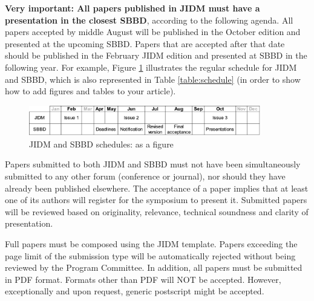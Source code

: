 \documentclass[jidm,a4paper]{jidm} %
\begin{document}
\textbf{Very important: All papers published in JIDM must have a presentation in the closest SBBD}, according to the following agenda. All papers accepted by middle August will be published in the October edition and presented at the upcoming SBBD. Papers that are accepted after that date should be published in the February JIDM edition and presented at SBBD in the following year. For example, Figure \ref{fig:schedule} illustrates the regular schedule for JIDM and SBBD, which is also represented in Table \ref{table:schedule} (in order to show how to add figures and tables to your article).


\begin{figure}[t] %
\begin{center}	%
		\includegraphics[width=0.9\textwidth]{schedule.pdf} %
	\caption{JIDM and SBBD schedules: as a figure\label{fig:schedule}}	
\end{center}
\end{figure}

Papers submitted to both JIDM and SBBD must not have been simultaneously submitted to any other forum (conference or journal), nor should they have already been published elsewhere.  The acceptance of a paper implies that at least one of its authors will register for the symposium to present it. Submitted papers will be reviewed based on originality, relevance, technical soundness and clarity of presentation.

Full papers must be composed using the JIDM template. Papers exceeding the page limit of the submission type will be automatically rejected without being reviewed by the Program Committee. In addition, all papers must be submitted in PDF format. Formats other than PDF will NOT be accepted. However, exceptionally and upon request, generic postscript might be accepted.
\end{document}
